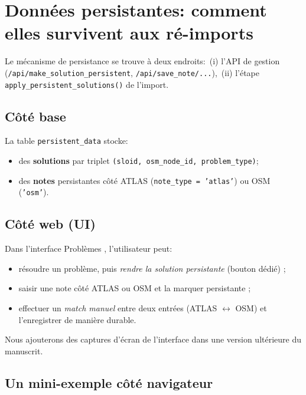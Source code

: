 \section{Données persistantes: comment elles survivent aux ré-imports}
Le mécanisme de persistance se trouve à deux endroits:\ (i) l'API de gestion (\texttt{/api/make\_solution\_persistent}, \texttt{/api/save\_note/...}),\ (ii) l'étape \texttt{apply\_persistent\_solutions()} de l'import.

\subsection*{Côté base}
La table \texttt{persistent\_data} stocke:
\begin{itemize}
  \item des \textbf{solutions} par triplet \texttt{(sloid, osm\_node\_id, problem\_type)};
  \item des \textbf{notes} persistantes côté ATLAS (\texttt{note\_type = 'atlas'}) ou OSM (\texttt{'osm'}).
\end{itemize}

\subsection*{Côté web (UI)}
Dans l'interface \og Problèmes \fg{}, l'utilisateur peut:
\begin{itemize}
  \item résoudre un problème, puis \textit{rendre la solution persistante} (bouton dédié) ;
  \item saisir une note côté ATLAS ou OSM et la marquer persistante ;
  \item effectuer un \textit{match manuel} entre deux entrées (ATLAS $\leftrightarrow$ OSM) et l'enregistrer de manière durable.
\end{itemize}
Nous ajouterons des captures d'écran de l'interface dans une version ultérieure du manuscrit.

\subsection*{Un mini-exemple côté navigateur}


